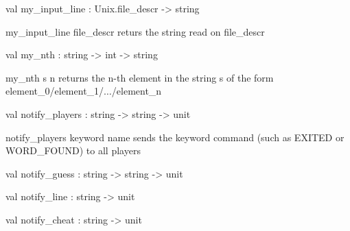 \documentclass[11pt]{article}
\begin{document}
\label{val:Server.my-underscoreinput-underscoreline}\begin{ocamldoccode}
val my_input_line : Unix.file_descr -> string
\end{ocamldoccode}
\begin{ocamldocdescription}
my\_input\_line file\_descr returs the string read on file\_descr


\end{ocamldocdescription}




\label{val:Server.my-underscorenth}\begin{ocamldoccode}
val my_nth : string -> int -> string
\end{ocamldoccode}
\begin{ocamldocdescription}
my\_nth s n returns the n-th element in the string s of the form element\_0/element\_1/$\ldots$/element\_n


\end{ocamldocdescription}




\label{val:Server.notify-underscoreplayers}\begin{ocamldoccode}
val notify_players : string -> string -> unit
\end{ocamldoccode}
\begin{ocamldocdescription}
notify\_players keyword name sends the keyword command (such as EXITED or WORD\_FOUND) to all players


\end{ocamldocdescription}




\label{val:Server.notify-underscoreguess}\begin{ocamldoccode}
val notify_guess : string -> string -> unit
\end{ocamldoccode}




\label{val:Server.notify-underscoreline}\begin{ocamldoccode}
val notify_line : string -> unit
\end{ocamldoccode}




\label{val:Server.notify-underscorecheat}\begin{ocamldoccode}
val notify_cheat : string -> unit
\end{ocamldoccode}
\end{document}

